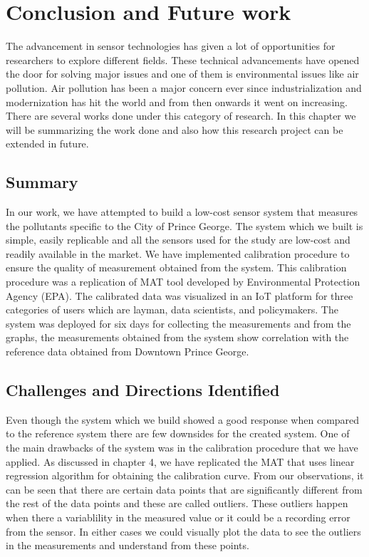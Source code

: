 \chapter{Conclusion and Future work}

The advancement in sensor technologies has given a lot of opportunities for researchers to explore different fields. These technical advancements have opened the door for solving major issues and one of them is environmental issues like air pollution. Air pollution has been a major concern ever since industrialization and modernization has hit the world and from then onwards it went on increasing. There are several works done under this category of research. In this chapter we will be summarizing the work done and also how this research project can be extended in future.
    
\section{Summary}

 In our work, we have attempted to build a low-cost sensor system that measures the pollutants specific to the City of Prince George. The system which we built is simple, easily replicable and all the sensors used for the study are low-cost and readily available in the market. We have implemented calibration procedure to ensure the quality of measurement obtained from the system. This calibration procedure was a replication of MAT tool developed by Environmental Protection Agency (EPA). The calibrated data was visualized in an IoT platform for three categories of users which are layman, data scientists, and policymakers. The system was deployed for six days for collecting the measurements and from the graphs, the measurements obtained from the system show correlation with the reference data obtained from Downtown Prince George.

\section{Challenges and Directions Identified}


Even though the system which we build showed a good response when compared to the reference system there are few downsides for the created system. 
One of the main drawbacks of the system was in the calibration procedure that we have applied. As discussed in chapter 4, we have replicated the MAT that uses linear regression algorithm for obtaining the calibration curve. From our observations, it can be seen that there are certain data points that are significantly different from the rest of the data points and these are called outliers. These outliers happen when there a variablility in the measured value or it could be a recording error from the sensor. In either cases we could visually plot the data to see the outliers in the measurements and understand from these points. %

